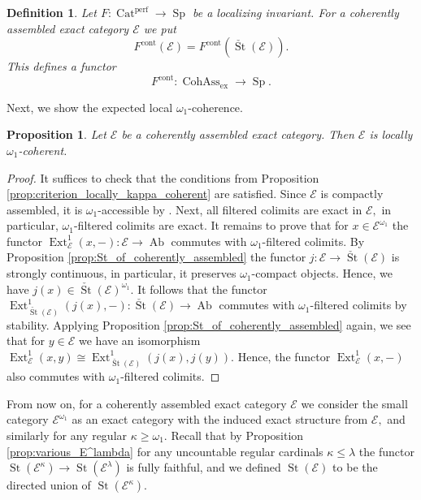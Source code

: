 \documentclass[11pt,leqno]{amsart}
\newtheorem{defi}[theo]{Definition}
\newtheorem{prop}[theo]{Proposition}
\numberwithin{equation}{section}
\newcommand{\Cat}{\operatorname{Cat}}
\newcommand{\cont}{\operatorname{cont}}
\newcommand{\ex}{\operatorname{ex}}
\newcommand{\St}{\operatorname{St}}
\newcommand{\cE}{{\mathcal E}}
\newcommand{\Cohass}{\operatorname{CohAss}}
\newcommand{\Ab}{\operatorname{Ab}}
\newcommand{\perf}{\operatorname{perf}}
\newcommand{\Ext}{\operatorname{Ext}}
\newcommand{\Sp}{\operatorname{Sp}}
\begin{document}
\begin{defi}\label{def:F^cont_for_coh_ass_exact_categories}
Let $F:\Cat^{\perf}\to \Sp$ be a localizing invariant. For a coherently assembled exact category $\cE$ we put
\begin{equation*}
F^{\cont}(\cE)=F^{\cont}(\check{\St}(\cE)).
\end{equation*} 
This defines a functor
\begin{equation*}
F^{\cont}:\Cohass_{\ex}\to\Sp.
\end{equation*} 
\end{defi}

Next, we show the expected local $\omega_1$-coherence.

\begin{prop}\label{prop:coherently_assembled_is_locally_omega_1_coherent}
Let $\cE$ be a coherently assembled exact category. Then $\cE$ is locally $\omega_1$-coherent.
\end{prop}

\begin{proof}
It suffices to check that the conditions from Proposition \ref{prop:criterion_locally_kappa_coherent} are satisfied. Since $\cE$ is compactly assembled, it is $\omega_1$-accessible by \cite[Proposition 1.24]{E24}. Next, all filtered colimits are exact in $\cE,$ in particular, $\omega_1$-filtered colimits are exact. It remains to prove that for $x\in\cE^{\omega_1}$ the functor $\Ext^1_{\cE}(x,-):\cE\to\Ab$ commutes with $\omega_1$-filtered colimits. By Proposition \ref{prop:St_of_coherently_assembled} the functor $j:\cE\to\check{\St}(\cE)$ is strongly continuous, in particular, it preserves $\omega_1$-compact objects. Hence, we have $j(x)\in\check{\St}(\cE)^{\omega_1}.$ It follows that the functor $\Ext^1_{\check{\St}(\cE)}(j(x),-):\check{\St}(\cE)\to\Ab$ commutes with $\omega_1$-filtered colimits by stability. Applying Proposition \ref{prop:St_of_coherently_assembled} again, we see that for $y\in\cE$ we have an isomorphism $\Ext^1_{\cE}(x,y)\cong \Ext^1_{\check{\St}(\cE)}(j(x),j(y)).$ Hence, the functor $\Ext^1_{\cE}(x,-)$ also commutes with $\omega_1$-filtered colimits.
\end{proof}

From now on, for a coherently assembled exact category $\cE$ we consider the small category $\cE^{\omega_1}$ as an exact category with the induced exact structure from $\cE,$ and similarly for any regular $\kappa\geq\omega_1.$ Recall that by Proposition \ref{prop:various_E^lambda} for any uncountable regular cardinals $\kappa\leq \lambda$ the functor $\St(\cE^{\kappa})\to\St(\cE^{\lambda})$ is fully faithful, and we defined $\St(\cE)$ to be the directed union of $\St(\cE^{\kappa}).$ 
\end{document}
